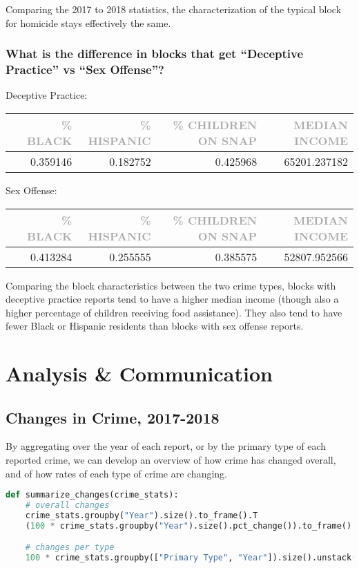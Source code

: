 \documentclass[11pt]{article}
\newcommand{\printsubsection}[1]{\normalfont\headerfontlt\textcolor{darkgray}{{#1}}}
\newcommand{\opns}[1]{\textrm{\small\printsubsection{\MakeUppercase{#1}}}}
\begin{document}
Comparing the 2017 to 2018 statistics, the characterization of the typical block for homicide stays effectively the same.

\subsubsection{What is the difference in blocks that get “Deceptive Practice” vs “Sex Offense”?}
Deceptive Practice:
\begin{table}[H]
\centering\renewcommand{\arraystretch}{1.2}
\begin{tabular}{lrrrr}
   &     \opns{\% BLACK} &  \opns{\% HISPANIC} &  \opns{\% CHILDREN ON SNAP} &  \opns{MEDIAN INCOME} \\\hline
   &      0.359146 &      0.182752 &        0.425968 &   65201.237182 \\
\end{tabular}
\end{table}

Sex Offense:
\begin{table}[H]
\centering\renewcommand{\arraystretch}{1.2}
\begin{tabular}{lrrrr}
   &    \opns{\% BLACK} &  \opns{\% HISPANIC} &  \opns{\% CHILDREN ON SNAP} &  \opns{MEDIAN INCOME} \\\hline
   &     0.413284 &      0.255555 &        0.385575 &   52807.952566 \\
\end{tabular}
\end{table}
Comparing the block characteristics between the two crime types, blocks with deceptive practice reports tend to have a higher median income (though also a higher percentage of children receiving food assistance). They also tend to have fewer Black or Hispanic residents than blocks with sex offense reports.

\section{Analysis \& Communication}
\subsection{Changes in Crime, 2017-2018}
By aggregating over the year of each report, or by the primary type of each reported crime, we can develop an overview of how crime has changed overall, and of how rates of each type of crime are changing.

\begin{lstlisting}[language=Python,numbers=none]
def summarize_changes(crime_stats):
    # overall changes
    crime_stats.groupby("Year").size().to_frame().T
    (100 * crime_stats.groupby("Year").size().pct_change()).to_frame().T

    # changes per type
    100 * crime_stats.groupby(["Primary Type", "Year"]).size().unstack().T.pct_change().stack().sort_values(ascending=False)
\end{lstlisting}
\end{document}
